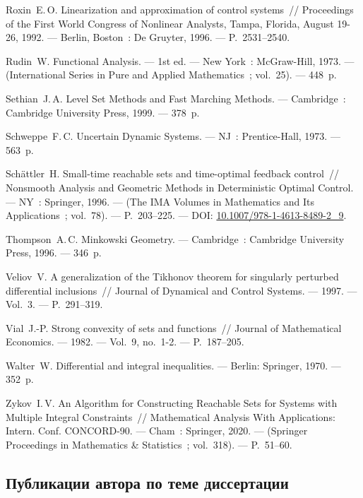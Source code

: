 \documentclass[../main.tex]{subfiles}
\begin{document}
\begin{thebibliography}{99}
Roxin~E.\,O. Linearization and approximation of control systems~// Proceedings of the First World Congress of Nonlinear Analysts, Tampa, Florida, August 19-26, 1992. --- Berlin, Boston~: De Gruyter, 1996. --- P.~2531--2540. 

Rudin~W. Functional Analysis. --- 1st ed. --- New York~: McGraw-Hill, 1973. --- (International Series in Pure and Applied Mathematics~; vol.~25). --- 448~p.

Sethian~J.\,A. Level Set Methods and Fast Marching Methods. --- Cambridge~: Cambridge University Press, 1999. --- 378~p.

Schweppe~F.\,C. Uncertain Dynamic Systems. --- NJ~: Prentice-Hall, 1973. --- 563~p.

Sch\"{a}ttler~H. Small-time reachable sets and time-optimal feedback control~// Nonsmooth Analysis and Geometric Methods in Deterministic Optimal Control. --- NY~: Springer, 1996. --- (The IMA Volumes in Mathematics and Its Applications~; vol.~78). --- P.~203--225. --- DOI: \href{https://doi.org/10.1007/978-1-4613-8489-2_9}{10.1007/978-1-4613-8489-2\_9}.

Thompson~A.\,C. Minkowski Geometry. --- Cambridge~: Cambridge University Press, 1996. --- 346~p.

Veliov~V. A generalization of the Tikhonov theorem for singularly perturbed differential inclusions~// Journal of Dynamical and Control Systems. --- 1997. --- Vol.~3. --- P.~291--319.

Vial~J.-P. Strong convexity of sets and functions~// Journal of Mathematical Economics. --- 1982. --- Vol.~9, no.~1-2. --- P.~187--205.  

Walter~W. Differential and integral inequalities. --- Berlin: Springer, 1970. --- 352~p.

Zykov~I.\,V. An Algorithm for Constructing Reachable Sets for Systems with Multiple Integral Constraints~// Mathematical Analysis With Applications: Intern. Conf. CONCORD-90. --- Cham~: Springer, 2020. --- (Springer Proceedings in Mathematics \& Statistics~; vol.~318). --- P.~51--60. 

\subsection*{Публикации автора по теме диссертации}

\end{thebibliography}
\end{document}
